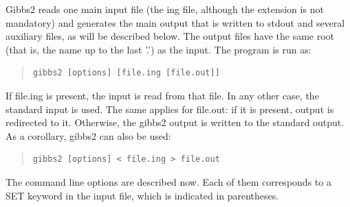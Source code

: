 \documentclass[a4paper]{article}
\begin{document}
Gibbs2 reads one main input file (the ing file, although the extension
is not mandatory) and generates the main output that is written to
stdout and several auxiliary files, as will be described below. The
output files have the same root (that is, the name up to the last '.')
as the input. The program is run as:

\begin{quote}
\begin{verbatim}
gibbs2 [options] [file.ing [file.out]]
\end{verbatim}
\end{quote}

If file.ing is present, the input is read from that file. In any other
case, the standard input is used. The same applies for file.out: if it
is present, output is redirected to it. Otherwise, the gibbs2 output
is written to the standard output. As a corollary, gibbs2 can also be
used:

\begin{quote}
\begin{verbatim}
gibbs2 [options] < file.ing > file.out
\end{verbatim}
\end{quote}

The command line options are described now. Each of them corresponds
to a SET keyword in the input file, which is indicated in
parentheses.
\end{document}

